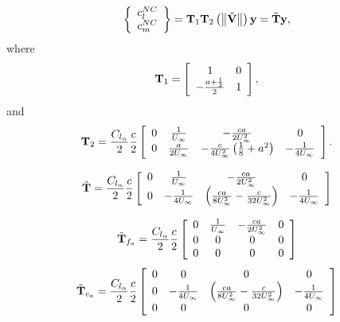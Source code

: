 \begin{equation}
	\left\{ 
	\begin{array}{c}
	c_l^{NC} \\ c_m^{NC}
	\end{array} 
	\right\}=  \bm{\mathbf{T}}_1 \bm{\mathbf{T}}_2 \left(  \left\| \tilde{\bm{\mathbf{V}}} \right\| \right) \bm{\mathbf{y}} = \tilde{\bm{\mathbf{T}}} \bm{\mathbf{y}},
\end{equation}
where
\begin{equation}
	\bm{\mathbf{T}}_1 = \left[
		\begin{array}{cc}
		 1 & 0 \\
		-\frac{a+\frac{1}{2}}{2} & 1
		\end{array}
		\right],
\end{equation}
and
\begin{equation}
	\bm{\mathbf{T}}_2 = \frac{C_{l_\alpha}}{2} \frac{c}{2}\left[
		\begin{array}{cccc} 
		0 & \frac{1}{U_\infty} & -\frac{c a}{2 U_\infty^2} & 0\\
		0 & \frac{a}{2 U_\infty} & -\frac{c}{4 U_\infty^2}\left( \frac{1}{8} + a^2\right) & -\frac{1}{4U_\infty}
		\end{array}
		\right].
\end{equation}
		
	
\begin{equation}
	\tilde{\bm{\mathbf{T}}} = \frac{C_{l_\alpha}}{2} \frac{c}{2} \left[
		\begin{array}{cccc}
		0 & \frac{1}{U_\infty} & -\frac{c a}{2 U_\infty^2} & 0\\
		0 &
		-\frac{1}{4 U_\infty} &
		\left(  \frac{ c a}{8 U_\infty^2} - \frac{c}{32 U_\infty^2}  \right)& 
		-\frac{1}{4 U_\infty}
		\end{array}	
		\right]
\end{equation}

\begin{equation}
	\tilde{\bm{\mathbf{T}}}_{f_a} = \frac{C_{l_\alpha}}{2} \frac{c}{2} \left[
		\begin{array}{cccc}
		0 & \frac{1}{U_\infty} & -\frac{c a}{2 U_\infty^2} & 0\\
		0 & 0 & 0 & 0\\
		0 & 0 & 0 & 0
		\end{array}
		\right]
\end{equation}
\begin{equation}
	\tilde{\bm{\mathbf{T}}}_{c_a} = \frac{C_{l_\alpha}}{2} \frac{c}{2} \left[
		\begin{array}{cccc}
		0 & 0 & 0 & 0\\
		0 &
		-\frac{1}{4 U_\infty} &
		\left(  \frac{ c a}{8 U_\infty^2} - \frac{c}{32 U_\infty^2}  \right)& 
		-\frac{1}{4 U_\infty}\\
		0 & 0 & 0 & 0
		\end{array}
		\right]
\end{equation}

